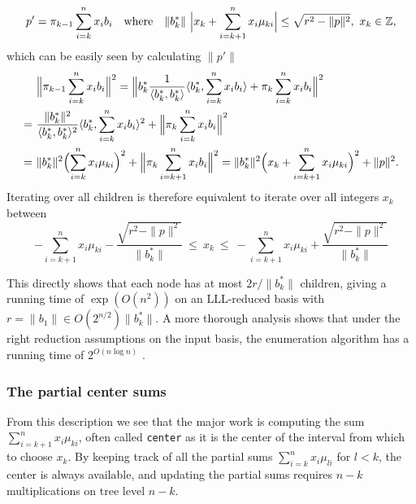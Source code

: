 \documentclass{scrartcl}
\newcommand{\Z}{\mathbb{Z}}
\begin{document}
    \begin{equation*}
        p' = \pi_{k - 1}\sum_{i = k}^n x_i b_i \quad \text{where} \quad \|b_k^*\| \ \Bigl|x_k + \sum_{i = k + 1}^n x_i \mu_{ki} \Bigr| \leq \sqrt{r^2 - \|p\|^2}, \ x_k \in \Z,
    \end{equation*}
    which can be easily seen by calculating $\|p'\|$
    \begin{align*}
        &\Bigl\| \pi_{k - 1}\sum_{i = k}^n x_i b_i \Bigr\|^2 = \Bigl\| b^*_k \frac 1 {\langle b^*_k, b^*_k \rangle} \langle b^*_k, \sum_{i = k}^n x_i b_i \rangle + \pi_k \sum_{i = k}^n x_i b_i \Bigr\|^2 \\
        =\ &\frac {\| b_k^* \|^2} {\langle b^*_k, b^*_k \rangle^2} \langle b_k^*, \sum_{i = k}^n x_i b_i \rangle^2 + \Bigl\| \pi_k \sum_{i = k}^n x_i b_i \Bigr\|^2 \\
        =\ &\| b^*_k \| ^2 \Bigl( \sum_{i = k}^n x_i\mu_{ki} \Bigr)^2 + \Bigl\| \pi_k \sum_{i = k + 1}^n x_i b_i \Bigr\|^2 = \|b_k^*\|^2 \Bigl( x_k + \sum_{i = k + 1}^n x_i \mu_{ki} \Bigr)^2 + \| p \|^2 .
    \end{align*}
    Iterating over all children is therefore equivalent to iterate over all integers $x_k$ between
    \begin{equation*}
        -\sum_{i = k + 1}^n x_i \mu_{ki} - \frac {\sqrt{r^2 - \|p\|^2}} {\| b_k^* \|} \ \leq \  x_k \ \leq \ -\sum_{i = k + 1}^n x_i \mu_{ki} + \frac {\sqrt{r^2 - \|p\|^2}} {\| b_k^* \|}
    \end{equation*}

    This directly shows that each node has at most $2r/\| b_k^* \|$ children, giving a running time of $\exp({O(n^2)})$ on an LLL-reduced basis with $r = \| b_1 \| \in O(2^{n/2}) \| b_k^* \|$. 
    A more thorough analysis shows that under the right reduction assumptions on the input basis, the enumeration algorithm has a running time of $2^{O(n\log n)}$ \cite{enum1, enum_complexity}.

    \subsubsection*{The partial center sums}

    \label{sec:center_partsums}
    From this description we see that the major work is computing the sum $\sum_{i = k + 1}^n x_i \mu_{ki}$, often called \texttt{center} as it is the center of the interval from which to choose $x_k$. By keeping track of all the partial sums $\sum_{i=k}^n x_i \mu_{li}$ for $l < k$, the center is always available, and updating the partial sums requires $n - k$ multiplications on tree level $n - k$.
\end{document}
